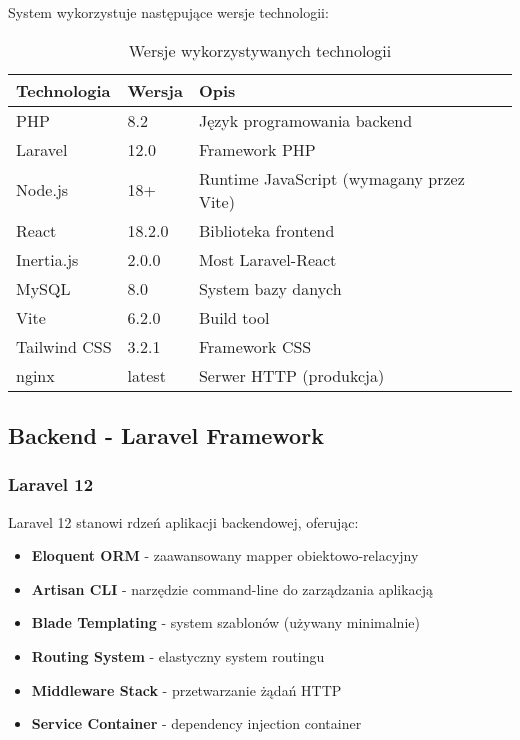     System wykorzystuje następujące wersje technologii:

    \begin{table}[h]
        \centering
        \begin{tabular}{|l|l|l|}
            \hline
            \textbf{Technologia} & \textbf{Wersja} & \textbf{Opis} \\
            \hline
            PHP & 8.2 & Język programowania backend \\
            Laravel & 12.0 & Framework PHP \\
            Node.js & 18+ & Runtime JavaScript (wymagany przez Vite) \\
            React & 18.2.0 & Biblioteka frontend \\
            Inertia.js & 2.0.0 & Most Laravel-React \\
            MySQL & 8.0 & System bazy danych \\
            Vite & 6.2.0 & Build tool \\
            Tailwind CSS & 3.2.1 & Framework CSS \\
            nginx & latest & Serwer HTTP (produkcja) \\
            \hline
        \end{tabular}
        \caption{Wersje wykorzystywanych technologii}
    \end{table}

    \subsection{Backend - Laravel Framework}

    \subsubsection{Laravel 12}
    Laravel 12 stanowi rdzeń aplikacji backendowej, oferując:

    \begin{itemize}
        \item \textbf{Eloquent ORM} - zaawansowany mapper obiektowo-relacyjny
        \item \textbf{Artisan CLI} - narzędzie command-line do zarządzania aplikacją
        \item \textbf{Blade Templating} - system szablonów (używany minimalnie)
        \item \textbf{Routing System} - elastyczny system routingu
        \item \textbf{Middleware Stack} - przetwarzanie żądań HTTP
        \item \textbf{Service Container} - dependency injection container
    \end{itemize}

